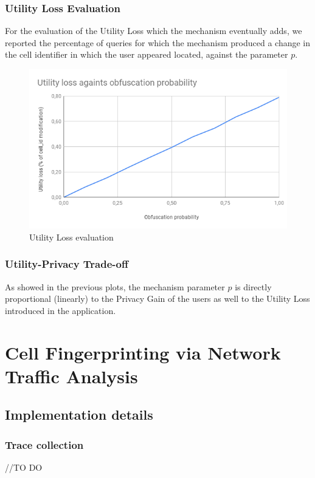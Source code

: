 \documentclass[10pt,conference,compsocconf]{IEEEtran}
\begin{document}
\subsubsection{Utility Loss Evaluation}
For the evaluation of the Utility Loss which the mechanism eventually adds, we
reported the percentage of queries for which the mechanism produced a change in
the cell identifier in which the user appeared located, against the parameter
$p$.
\begin{figure}[h!]
    \centering
    \includegraphics[width=0.9\linewidth]{../privacy_evaluation/utility_loss.png}
    \caption{Utility Loss evaluation}
\end{figure}
\subsubsection{Utility-Privacy Trade-off}
As showed in the previous plots, the mechanism parameter $p$ is directly
proportional (linearly) to the Privacy Gain of the users as well to the Utility
Loss introduced in the application.
\section{Cell Fingerprinting via Network Traffic Analysis}

\subsection{Implementation details}
\subsubsection{Trace collection}
//TO DO
\end{document}
